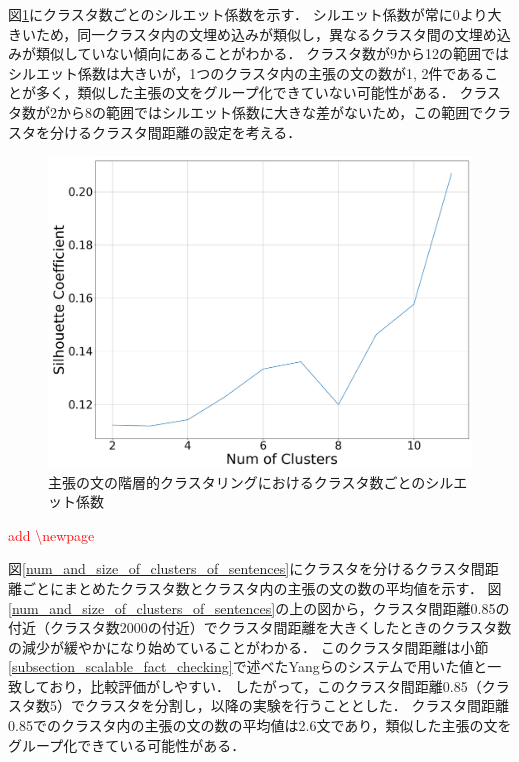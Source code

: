 \documentclass[12pt,a4j]{jreport}
\begin{document}
図\ref{sentences_silhouette}にクラスタ数ごとのシルエット係数を示す．
シルエット係数が常に0より大きいため，同一クラスタ内の文埋め込みが類似し，異なるクラスタ間の文埋め込みが類似していない傾向にあることがわかる．
クラスタ数が9から12の範囲ではシルエット係数は大きいが，1つのクラスタ内の主張の文の数が1, 2件であることが多く，類似した主張の文をグループ化できていない可能性がある．
クラスタ数が2から8の範囲ではシルエット係数に大きな差がないため，この範囲でクラスタを分けるクラスタ間距離の設定を考える．

\begin{figure}[H]
	\centering
	\includegraphics[keepaspectratio, width=120mm]{img/process-07_sentences-cluster_from-cluster-230_with-threshold-85_num-of-clusters-dependency-on-silhouette-coefficient_reduced-data-to-5000_Trim.png}
	\caption{主張の文の階層的クラスタリングにおけるクラスタ数ごとのシルエット係数}
	\label{sentences_silhouette}
\end{figure}

\textcolor{red}{add \textbackslash newpage}
\newpage

図\ref{num_and_size_of_clusters_of_sentences}にクラスタを分けるクラスタ間距離ごとにまとめたクラスタ数とクラスタ内の主張の文の数の平均値を示す．
図\ref{num_and_size_of_clusters_of_sentences}の上の図から，クラスタ間距離0.85の付近（クラスタ数2000の付近）でクラスタ間距離を大きくしたときのクラスタ数の減少が緩やかになり始めていることがわかる．
このクラスタ間距離は小節\ref{subsection_scalable_fact_checking}で述べたYangらのシステムで用いた値と一致しており，比較評価がしやすい\cite{yang_scalable_2021}．
したがって，このクラスタ間距離0.85（クラスタ数5）でクラスタを分割し，以降の実験を行うこととした．
クラスタ間距離0.85でのクラスタ内の主張の文の数の平均値は2.6文であり，類似した主張の文をグループ化できている可能性がある．
\end{document}
